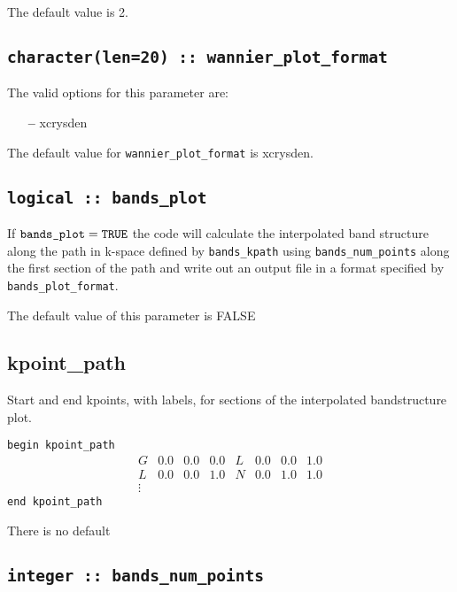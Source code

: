 The default value is 2.

\subsection[wannier\_plot\_format]{\tt character(len=20) :: wannier\_plot\_format}

The valid options for this parameter are:
\begin{itemize}
\item[{\bf --}] xcrysden
\end{itemize}

The default value for \verb#wannier_plot_format# is xcrysden.



\subsection[bands\_plot]{\tt logical :: bands\_plot}

If $\verb#bands_plot#=\verb#TRUE#$ the code will calculate the interpolated band structure along
the path in k-space defined by \verb#bands_kpath# using \verb#bands_num_points# along the first
section of the path and write out an output file in a format specified
by \verb#bands_plot_format#. 

The default value of this parameter is FALSE


\subsection[kpoint\_path]{kpoint\_path}
Start and end kpoints, with labels, for sections of the interpolated
bandstructure plot.

\noindent  \verb#begin kpoint_path#
$$
\begin{array}{cccccccc}
G & 0.0 & 0.0 & 0.0 & L & 0.0 & 0.0 & 1.0 \\
L & 0.0 & 0.0 & 1.0 & N & 0.0 & 1.0 & 1.0 \\
\vdots
\end{array}
$$
\verb#end kpoint_path#

There is no default

\subsection[bands\_num\_points]{\tt integer :: bands\_num\_points}

